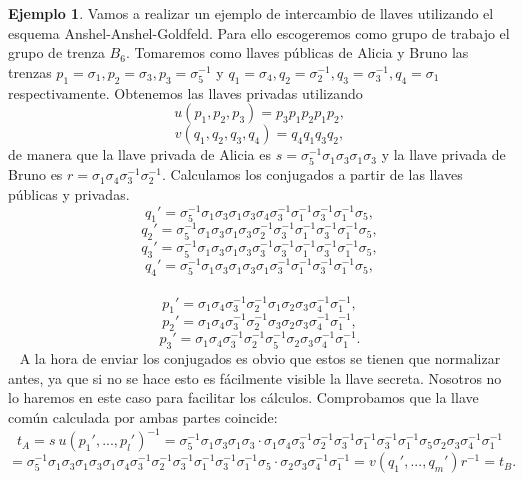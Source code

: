 \documentclass[12pt]{book}
\theoremstyle{definition}
\newtheorem{ejem}{Ejemplo}[section]
\begin{document}
\begin{ejem}
Vamos a realizar un ejemplo de intercambio de llaves utilizando el esquema Anshel-Anshel-Goldfeld. Para ello escogeremos como grupo de trabajo el grupo de trenza $B_6$. Tomaremos como llaves públicas de Alicia y Bruno las trenzas $p_1 = \sigma_1, p_2 = \sigma_3, p_3 =\sigma_5^{-1}$ y $q_1 = \sigma_4, q_2 = \sigma_2^{-1}, q_3 = \sigma_3^{-1}, q_4 = \sigma_1$ respectivamente. Obtenemos las llaves privadas utilizando
$$u(p_1,p_2,p_3)= p_3p_1p_2p_1p_2,$$
$$v(q_1,q_2,q_3,q_4)= q_4q_1q_3q_2,$$
de manera que la llave privada de Alicia es $s=\sigma_5^{-1}\sigma_1\sigma_3\sigma_1\sigma_3$ y la llave privada de Bruno es $r = \sigma_1\sigma_4\sigma_3^{-1}\sigma_2^{-1}$. Calculamos los conjugados a partir de las llaves públicas y privadas.
$$q_1' = \sigma_5^{-1}\sigma_1\sigma_3\sigma_1\sigma_3 \sigma_4 \sigma_3^{-1}\sigma_1^{-1}\sigma_3^{-1}\sigma_1^{-1}\sigma_5,$$
$$q_2' = \sigma_5^{-1}\sigma_1\sigma_3\sigma_1\sigma_3 \sigma_2^{-1} \sigma_3^{-1}\sigma_1^{-1}\sigma_3^{-1}\sigma_1^{-1}\sigma_5,$$
$$q_3' = \sigma_5^{-1}\sigma_1\sigma_3\sigma_1\sigma_3 \sigma_3^{-1} \sigma_3^{-1}\sigma_1^{-1}\sigma_3^{-1}\sigma_1^{-1}\sigma_5,$$
$$q_4' = \sigma_5^{-1}\sigma_1\sigma_3\sigma_1\sigma_3 \sigma_1 \sigma_3^{-1}\sigma_1^{-1}\sigma_3^{-1}\sigma_1^{-1}\sigma_5,$$
\ 
\newline
$$p_1' = \sigma_1\sigma_4\sigma_3^{-1}\sigma_2^{-1} \sigma_1 \sigma_2\sigma_3\sigma_4^{-1}\sigma_1^{-1},$$
$$p_2' = \sigma_1\sigma_4\sigma_3^{-1}\sigma_2^{-1} \sigma_3 \sigma_2\sigma_3\sigma_4^{-1}\sigma_1^{-1},$$
$$p_3' = \sigma_1\sigma_4\sigma_3^{-1}\sigma_2^{-1} \sigma_5^{-1} \sigma_2\sigma_3\sigma_4^{-1}\sigma_1^{-1}.$$
\ 
\newline
A la hora de enviar los conjugados es obvio que estos se tienen que normalizar antes, ya que si no se hace esto es fácilmente visible la llave secreta. Nosotros no lo haremos en este caso para facilitar los cálculos. Comprobamos que la llave común calculada por ambas partes coincide:
$$t_A = s\ u(p_1',...,p_l')^{-1} = \sigma_5^{-1}\sigma_1\sigma_3\sigma_1\sigma_3\cdot\sigma_1\sigma_4\sigma_3^{-1}\sigma_2^{-1} \sigma_3^{-1} \sigma_1^{-1}\sigma_3^{-1} \sigma_1^{-1}\sigma_5 \sigma_2\sigma_3\sigma_4^{-1}\sigma_1^{-1}$$
$$=\sigma_5^{-1}\sigma_1\sigma_3\sigma_1\sigma_3\sigma_1\sigma_4\sigma_3^{-1}\sigma_2^{-1} \sigma_3^{-1} \sigma_1^{-1}\sigma_3^{-1} \sigma_1^{-1}\sigma_5 \cdot\sigma_2\sigma_3\sigma_4^{-1}\sigma_1^{-1}=v(q_1',...,q_m')r^{-1} = t_B.$$

\end{ejem}
\end{document}
